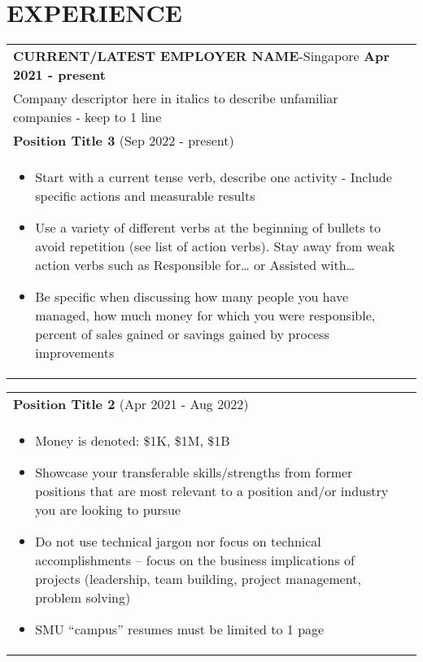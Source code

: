 \documentclass[a4paper,8pt]{article}
\begin{document}
\section{\textbf{EXPERIENCE}}
\begin{tabularx}{\linewidth}{ @{}l r@{} }
\textbf{CURRENT/LATEST EMPLOYER NAME}-Singapore \hfill \textbf{Apr 2021 - present} \\[4pt]
[Optional if needed] Company descriptor here in italics to describe unfamiliar companies - keep to 1 line \\[4pt]
\textbf{Position Title 3} (Sep 2022 - present) \\[4pt]
\begin{minipage}[t]{\linewidth}
    \begin{itemize}[nosep,after=\strut, leftmargin=1em, itemsep=2pt]
        \item Start with a current tense verb, describe one activity - Include specific actions and measurable results
        \item Use a variety of different verbs at the beginning of bullets to avoid repetition (see list of action verbs).  Stay away from weak action verbs such as Responsible for… or Assisted with… 
        \item Be specific when discussing how many people you have managed, how much money for which you were responsible, percent of sales gained or savings gained by process improvements
    \end{itemize}
\end{minipage}
\end{tabularx}

\begin{tabularx}{\linewidth}{ @{}l r@{} }
\textbf{Position Title 2} (Apr 2021 - Aug 2022) \\[4pt]
\begin{minipage}[t]{\linewidth}
    \begin{itemize}[nosep,after=\strut, leftmargin=1em, itemsep=2pt]
        \item Money is denoted:  \$1K, \$1M, \$1B
        \item Showcase your transferable skills/strengths from former positions that are most relevant to a position and/or industry you are looking to pursue
        \item Do not use technical jargon nor focus on technical accomplishments – focus on the business implications of projects (leadership, team building, project management, problem solving)
        \item SMU “campus” resumes must be limited to 1 page
    \end{itemize}
\end{minipage}
\end{tabularx}
\end{document}
